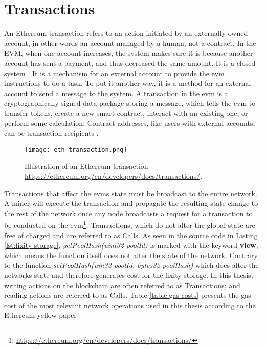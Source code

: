 \section{Transactions}\label{sec:tx-cost}
An Ethereum transaction refers to an action initiated by an externally-owned account, in other words an account managed by a human, not a contract. In the EVM, when one account increases, the system makes sure it is because another account has sent a payment, and thus decreased the same amount. It is a closed system \cite[25]{dannen2017introducing}.
It is a mechanism for an external account to provide the \acrshort{evm} instructions to do a task. To put it another way, it is a method for an external account to send a message to the system. A transaction in the \acrshort{evm} is a cryptographically signed data package storing a message, which tells the \acrshort{evm} to transfer tokens, create a new smart contract, interact with an existing one, or perform some calculation. Contract addresses, like users with external accounts, can be transaction recipients \cite[60]{dannen2017introducing}. 
\begin{figure}[t]
    \centering
    \texttt{[image: eth\_transaction.png]}
    \caption{Illustration of an Ethereum transaction \url{https://ethereum.org/en/developers/docs/transactions/}.}
\end{figure}
Transactions that affect the \acrshort{evm}s state must be broadcast to the entire network. A miner will execute the transaction and propagate the resulting state change to the rest of the network once any node broadcasts a request for a transaction to be conducted on the \acrshort{evm}\footnote{\url{https://ethereum.org/en/developers/docs/transactions/}}.
Transactions, which do not alter the global state are free of charged and are referred to as Calls. As seen in the source code in Listing \ref{lst:fixity-storage}, \textit{getPoolHash(uint32 poolId)} is marked with the keyword \textbf{view}, which means the function itself does not alter the state of the network. Contrary to the function \textit{setPoolHash(uin32 poolId, bytes32 poolHash)} which does alter the networks state and therefore generates cost for the fixity storage. In this thesis, writing actions on the blockchain are often referred to as Transactions; and reading actions are referred to as Calls.
Table \ref{table:gas-costs} presents the gas cost of the most relevant network operations used in this thesis according to the Ethereum yellow paper \cite[27]{wood2014ethereum}.
